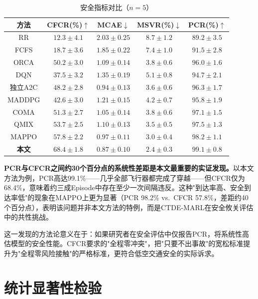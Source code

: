 \documentclass[12pt,a4paper,UTF8]{ctexbook}
\begin{document}
\begin{table}[H]
    \centering
    \caption{安全指标对比（$n=5$）}
    \label{tab:safety}
    \begin{tabular}{|c|c|c|c|c|}
        \hline
        \textbf{方法} & \textbf{CFCR(\%)$\uparrow$} & \textbf{MCAE$\downarrow$} & \textbf{MSVR(\%)$\downarrow$} & \textbf{PCR(\%)$\uparrow$} \\
        \hline
        RR & $12.3\pm4.1$ & $2.03\pm0.25$ & $8.7\pm1.2$ & $89.2\pm3.5$ \\
        FCFS & $18.7\pm3.6$ & $1.85\pm0.22$ & $7.4\pm1.0$ & $91.5\pm2.8$ \\
        ORCA & $50.2\pm3.0$ & $1.09\pm0.14$ & $3.8\pm0.6$ & $96.0\pm1.6$ \\
        DQN & $37.5\pm3.2$ & $1.35\pm0.19$ & $5.1\pm0.8$ & $94.7\pm2.1$ \\
        独立A2C & $48.2\pm2.8$ & $0.94\pm0.13$ & $3.6\pm0.6$ & $96.3\pm1.7$ \\
        MADDPG & $42.6\pm3.0$ & $1.21\pm0.15$ & $4.2\pm0.7$ & $95.8\pm1.9$ \\
        COMA & $51.3\pm2.7$ & $1.05\pm0.14$ & $3.8\pm0.6$ & $97.1\pm1.5$ \\
        QMIX & $53.7\pm2.5$ & $1.10\pm0.13$ & $3.5\pm0.5$ & $97.5\pm1.3$ \\
        MAPPO & $57.8\pm2.2$ & $0.97\pm0.11$ & $3.0\pm0.4$ & $98.2\pm1.1$ \\
        \textbf{本文} & $\mathbf{68.4\pm1.8}$ & $\mathbf{0.87\pm0.10}$ & $\mathbf{2.4\pm0.3}$ & $\mathbf{99.1\pm0.8}$ \\
        \hline
    \end{tabular}
\end{table}

\textbf{PCR与CFCR之间约30个百分点的系统性差距是本文最重要的实证发现。}以本文方法为例，PCR高达99.1\%——几乎全部飞行器都完成了穿越——但CFCR仅为68.4\%，意味着约三成Episode中存在至少一次间隔违反。这种"到达率高、安全到达率低"的现象在MAPPO上更为显著（PCR 98.2\% vs.\ CFCR 57.8\%，差距约40个百分点），表明该问题并非本文方法的特例，而是CTDE-MARL在安全攸关评估中的共性挑战。

这一发现的方法论意义在于：如果研究者在安全评估中仅报告PCR，将系统性高估模型的安全性能。CFCR要求的"全程零冲突"，把"只要不出事故"的宽松标准提升为"全程零风险接触"的严格标准，更符合低空交通安全的实际诉求。

\section{统计显著性检验}
\end{document}
